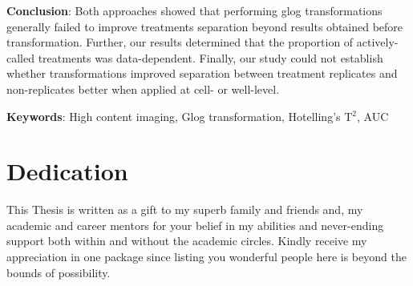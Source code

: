 \documentclass[11pt]{article}
\begin{document}
\par{\textbf{Conclusion}: Both approaches showed that performing glog transformations generally failed to improve treatments separation beyond results obtained before transformation. Further, our results determined that the proportion of actively-called treatments was data-dependent. Finally, our study could not establish whether transformations improved separation between treatment replicates and non-replicates better when applied at cell- or well-level. }
\par{\textbf{Keywords}: High content imaging, Glog transformation, Hotelling's T$^2$, AUC}
\clearpage
\tableofcontents
\clearpage
\section*{Dedication}
\par{This Thesis is written as a gift to my superb family and friends and, my academic and career mentors for your belief in my abilities and never-ending support both within and without the academic circles. Kindly receive my appreciation in one package since listing you wonderful people here is beyond the bounds of possibility.}
\end{document}
